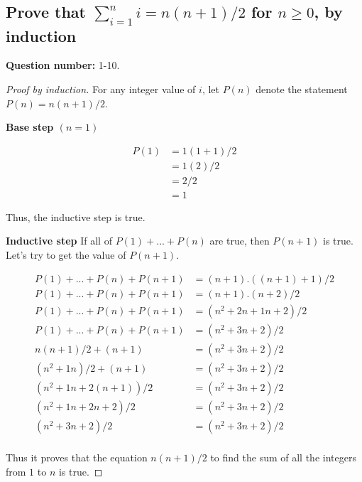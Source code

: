 \subsection{Prove that $\sum_{i=1}^{n} i = n(n+1)/2$ for $n \geq 0$, by induction}
  \textbf{Question number:} 1-10.

  \begin{proof}[Proof by induction]

    For any integer value of $i$, let $P(n)$ denote the statement $P(n) =
    n(n+1)/2$.

    \textbf{Base step $(n=1)$}

    \begin{align}
      P(1) &= 1(1+1)/2\\
           &= 1(2)/2\\
           &= 2/2\\
           &= 1
    \end{align}

    Thus, the inductive step is true.

    \textbf{Inductive step}
    If all of $P(1) + ... + P(n)$ are true, then $P(n+1)$ is true. Let's try to
    get the value of $P(n+1)$.

    \begin{align}
      P(1) + ... + P(n) + P(n+1) &= (n+1).((n+1)+1)/2\\
      P(1) + ... + P(n) + P(n+1) &= (n+1).(n+2)/2\\
      P(1) + ... + P(n) + P(n+1) &= (n^2 + 2n + 1n + 2)/2\\
      P(1) + ... + P(n) + P(n+1) &= (n^2 + 3n + 2) / 2\\
      n(n+1)/2 + (n+1) &= (n^2 + 3n + 2) / 2\\
      (n^2 + 1n)/2 + (n+1) &= (n^2 + 3n + 2) / 2\\
      (n^2 + 1n + 2(n+1))/2 &= (n^2 + 3n + 2) / 2\\
      (n^2 + 1n + 2n + 2)/2 &= (n^2 + 3n + 2) / 2\\
      (n^2 + 3n + 2)/2 &= (n^2 + 3n + 2) / 2\\
    \end{align}

    Thus it proves that the equation $n(n+1)/2$ to find the sum of all the
    integers from $1$ to $n$ is true.
    \qedhere
  \end{proof}
